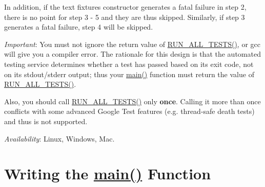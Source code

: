 In addition, if the text fixture\textquotesingle{}s constructor generates a fatal failure in step 2, there is no point for step 3 -\/ 5 and they are thus skipped. Similarly, if step 3 generates a fatal failure, step 4 will be skipped.

{\itshape Important}\+: You must not ignore the return value of {\ttfamily \hyperlink{gtest_8h_a853a3792807489591d3d4a2f2ff9359f}{R\+U\+N\+\_\+\+A\+L\+L\+\_\+\+T\+E\+S\+T\+S()}}, or {\ttfamily gcc} will give you a compiler error. The rationale for this design is that the automated testing service determines whether a test has passed based on its exit code, not on its stdout/stderr output; thus your {\ttfamily \hyperlink{app_2main_8cpp_ae66f6b31b5ad750f1fe042a706a4e3d4}{main()}} function must return the value of {\ttfamily \hyperlink{gtest_8h_a853a3792807489591d3d4a2f2ff9359f}{R\+U\+N\+\_\+\+A\+L\+L\+\_\+\+T\+E\+S\+T\+S()}}.

Also, you should call {\ttfamily \hyperlink{gtest_8h_a853a3792807489591d3d4a2f2ff9359f}{R\+U\+N\+\_\+\+A\+L\+L\+\_\+\+T\+E\+S\+T\+S()}} only {\bfseries once}. Calling it more than once conflicts with some advanced Google Test features (e.\+g. thread-\/safe death tests) and thus is not supported.

{\itshape Availability}\+: Linux, Windows, Mac.

\section*{Writing the \hyperlink{app_2main_8cpp_ae66f6b31b5ad750f1fe042a706a4e3d4}{main()} Function}

